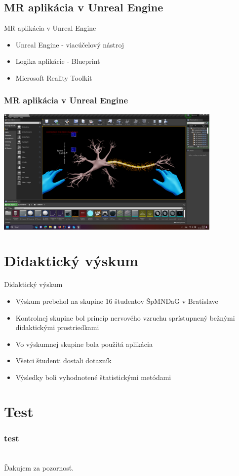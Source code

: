 \documentclass[pdf,aspectratio=169]{beamer}
\begin{document}
\subsection{MR aplikácia v Unreal Engine}
\begin{frame}{MR aplikácia v Unreal Engine}
    \begin{itemize}
        \item Unreal Engine - viacúčelový nástroj
        \item Logika aplikácie - Blueprint        
        \item Microsoft Reality Toolkit
    \end{itemize}
\end{frame}

\begin{frame}
    \frametitle{MR aplikácia v Unreal Engine}
    \begin{center}
        \includegraphics[width=11cm]{img/unreal.png}
    \end{center}
\end{frame}

\section{Didaktický výskum}
\begin{frame}{Didaktický výskum}
    \begin{itemize}
        \item Výskum prebehol na skupine 16 študentov ŠpMNDaG v Bratislave
        \item Kontrolnej skupine bol princíp nervového vzruchu sprístupnený bežnými didaktickými prostriedkami
        \item Vo výskumnej skupine bola použitá aplikácia
        \item Všetci študenti dostali dotazník
        \item Výsledky boli vyhodnotené štatistickými metódami
    \end{itemize}    
\end{frame}

\section{Test}
\begin{frame}
    \frametitle{test}

\end{frame}

\section*{}
\begin{frame}{}
    Ďakujem za pozornosť.
\end{frame}
\end{document}
